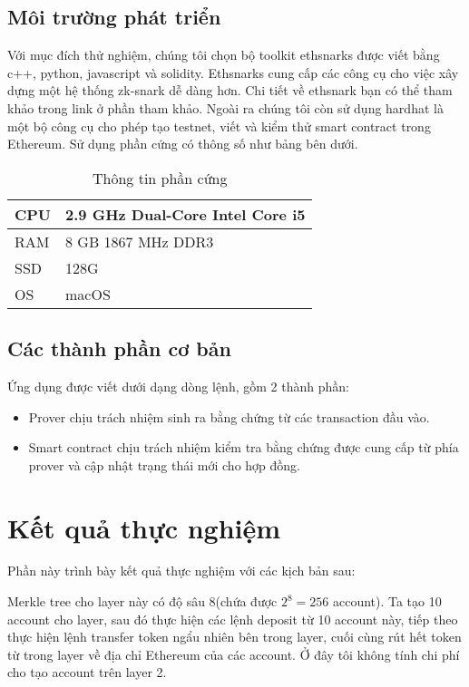 \documentclass[../thesis.tex]{subfiles}
\begin{document}
\subsection{Môi trường phát triển}
Với mục đích thử nghiệm, chúng tôi chọn bộ toolkit ethsnarks\cite{ethsnark} được viết bằng c++, python, javascript và solidity. Ethsnarks cung cấp các công cụ cho việc xây dựng một hệ thống zk-snark dễ dàng hơn. Chi tiết về ethsnark bạn có thể tham khảo trong link ở phần tham khảo. Ngoài ra chúng tôi còn sử dụng hardhat là một bộ công cụ cho phép tạo testnet, viết và kiểm thử smart contract trong Ethereum. 
Sử dụng phần cứng có thông số như bảng bên dưới.
\begin{table}[H]
\centering
\begin{tabular}{|l|l|}
\hline
CPU & 2.9 GHz Dual-Core Intel Core i5 \\ \hline
RAM &  8 GB 1867 MHz DDR3\\ \hline
SSD &  128G\\ \hline
OS &  macOS\\ \hline
\end{tabular}
\caption{Thông tin phần cứng}
\label{tab:my-table}
\end{table}

\subsection{Các thành phần cơ bản}
Ứng dụng được viết dưới dạng dòng lệnh, gồm 2 thành phần: 
\begin{itemize}
\item Prover chịu trách nhiệm sinh ra bằng chứng từ các transaction đầu vào.
\item Smart contract chịu trách nhiệm kiểm tra bằng chứng được cung cấp từ phía prover và cập nhật trạng thái mới cho hợp đồng.
\end{itemize}

\section{Kết quả thực nghiệm}
Phần này trình bày kết quả thực nghiệm với các kịch bản sau:

Merkle tree cho layer này có độ sâu 8(chứa được $2^8=256$ account). Ta tạo 10 account cho layer, sau đó thực hiện các lệnh deposit từ 10 account này, tiếp theo thực hiện lệnh transfer token ngẩu nhiên bên trong layer, cuối cùng rút hết token từ trong layer về địa chỉ Ethereum của các account. Ở đây tôi không tính chi phí cho tạo account trên layer 2.
\end{document}
